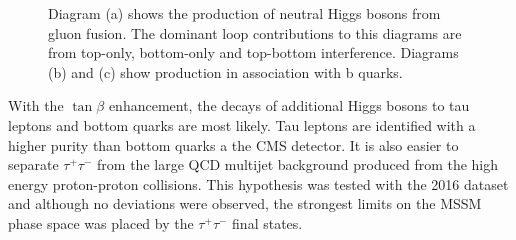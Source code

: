 \begin{figure}[H]
\begin{subfigure}[b]{0.3\textwidth}
\caption{}
\end{subfigure}
\hspace{2cm}
\begin{subfigure}[b]{0.3\textwidth}
\caption{}
\end{subfigure}
\caption{Diagram (a) shows the production of neutral Higgs bosons from gluon fusion. The dominant loop contributions to this diagrams are from top-only, bottom-only and top-bottom interference. Diagrams (b) and (c) show production in association with b quarks.}
\label{fig:mssm_feynamn}
\end{figure}

With the $\tan\beta$ enhancement, the decays of additional Higgs bosons to tau leptons and bottom quarks are most likely.
Tau leptons are identified with a higher purity than bottom quarks a the CMS detector.
It is also easier to separate $\tau^{+}\tau^{-}$ from the large QCD multijet background produced from the high energy proton-proton collisions.
This hypothesis was tested with the 2016 dataset and although no deviations were observed, the strongest limits on the MSSM phase space was placed by the $\tau^+\tau^-$ final states. \\

